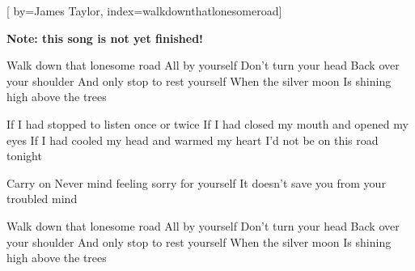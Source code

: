 

[%
    by={James Taylor},
    index={walkdownthatlonesomeroad}]


    \label{walkdownthatlonesomeroad}

    \textbf{Note: this song is not yet finished!}

    \beginchorus
        Walk down that lonesome road
        All by yourself
        Don't turn your head
        Back over your shoulder
        And only stop to rest yourself
        When the silver moon
        Is shining high above the trees
    \endchorus

    \beginverse
        If I had stopped to listen once or twice
        If I had closed my mouth and opened my eyes
        If I had cooled my head and warmed my heart
        I'd not be on this road tonight
    \endverse

    \beginverse*
        Carry on 
        Never mind feeling sorry for yourself
        It doesn't save you from your troubled mind
    \endverse

    \beginchorus
        Walk down that lonesome road
        All by yourself
        Don't turn your head
        Back over your shoulder
        And only stop to rest yourself
        When the silver moon
        Is shining high above the trees
    \endchorus
\endsong
